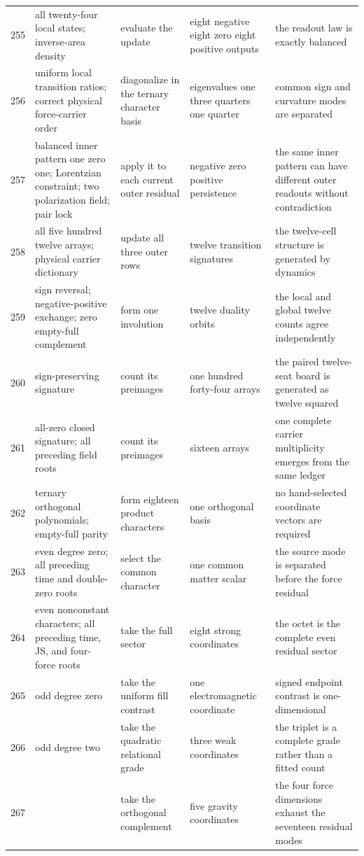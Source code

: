 \documentclass[11pt]{article}
\numberwithin{equation}{section}
\theoremstyle{remark}
\begin{document}
\begin{landscape}
\begin{longtable}{p{0.65cm}p{3.5cm}p{4.0cm}p{4.0cm}p{4.6cm}}
255&all twenty-four local states; inverse-area density&evaluate the update&eight negative eight zero eight positive outputs&the readout law is exactly balanced\\
256&uniform local transition ratios; correct physical force-carrier order&diagonalize in the ternary character basis&eigenvalues one three quarters one quarter&common sign and curvature modes are separated\\
257&balanced inner pattern one zero one; Lorentzian constraint; two polarization field; pair lock&apply it to each current outer residual&negative zero positive persistence&the same inner pattern can have different outer readouts without contradiction\\
258&all five hundred twelve arrays; physical carrier dictionary&update all three outer rows&twelve transition signatures&the twelve-cell structure is generated by dynamics\\
259&sign reversal; negative-positive exchange; zero empty-full complement&form one involution&twelve duality orbits&the local and global twelve counts agree independently\\
260&sign-preserving signature&count its preimages&one hundred forty-four arrays&the paired twelve-seat board is generated as twelve squared\\
261&all-zero closed signature; all preceding field roots&count its preimages&sixteen arrays&one complete carrier multiplicity emerges from the same ledger\\
262&ternary orthogonal polynomials; empty-full parity&form eighteen product characters&one orthogonal basis&no hand-selected coordinate vectors are required\\
263&even degree zero; all preceding time and double-zero roots&select the common character&one common matter scalar&the source mode is separated before the force residual\\
264&even nonconstant characters; all preceding time, JS, and four-force roots&take the full sector&eight strong coordinates&the octet is the complete even residual sector\\
265&odd degree zero&take the uniform fill contrast&one electromagnetic coordinate&signed endpoint contrast is one-dimensional\\
266&odd degree two&take the quadratic relational grade&three weak coordinates&the triplet is a complete grade rather than a fitted count\\
267&&take the orthogonal complement&five gravity coordinates&the four force dimensions exhaust the seventeen residual modes\\

\end{longtable}
\end{landscape}
\end{document}
